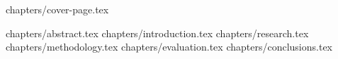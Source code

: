 \documentclass[a4paper,12pt]{article}
\begin{document}

{chapters/cover-page.tex}

\tableofcontents
\clearpage

{chapters/abstract.tex}
{chapters/introduction.tex}
{chapters/research.tex}
{chapters/methodology.tex}
{chapters/evaluation.tex}
{chapters/conclusions.tex}



\end{document}
